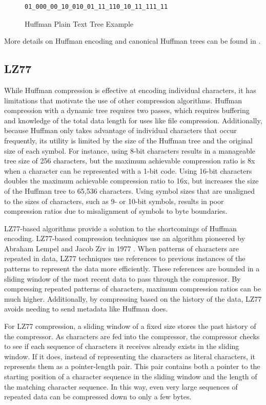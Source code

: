 \documentclass[doublespace,nopageskip]{VTthesis}
\begin{document}
\begin{figure}[htb]
	\centering
    \begin{lstlisting}
01_000_00_10_010_01_11_110_10_11_111_11
    \end{lstlisting}
	\caption{Huffman Plain Text Tree Example}
	\label{fig:huffman_plain_text}
\end{figure}

More details on Huffman encoding and canonical Huffman trees can be found in \cite{huffman, canonicalhuffman}.

\subsection{LZ77}\label{ss:lz77}
While Huffman compression is effective at encoding individual characters, it has limitations that motivate the use of other compression algorithms. Huffman compression with a dynamic tree requires two passes, which requires buffering and knowledge of the total data length for uses like file compression. Additionally, because Huffman only takes advantage of individual characters that occur frequently, its utility is limited by the size of the Huffman tree and the original size of each symbol. For instance, using 8-bit characters results in a manageable tree size of 256 characters, but the maximum achievable compression ratio is 8x when a character can be represented with a 1-bit code. Using 16-bit characters doubles the maximum achievable compression ratio to 16x, but increases the size of the Huffman tree to 65,536 characters. Using symbol sizes that are unaligned to the sizes of characters, such as 9- or 10-bit symbols, results in poor compression ratios due to misalignment of symbols to byte boundaries.

LZ77-based algorithms provide a solution to the shortcomings of Huffman encoding. LZ77-based compression techniques use an algorithm pioneered by Abraham Lempel and Jacob Ziv in 1977 \cite{lz77}. When patterns of characters are repeated in data, LZ77 techniques use references to previous instances of the patterns to represent the data more efficiently. These references are bounded in a sliding window of the most recent data to pass through the compressor. By compressing repeated patterns of characters, maximum compression ratios can be much higher. Additionally, by compressing based on the history of the data, LZ77 avoids needing to send metadata like Huffman does.

For LZ77 compression, a sliding window of a fixed size stores the past history of the compressor. As characters are fed into the compressor, the compressor checks to see if each sequence of characters it receives already exists in the sliding window. If it does, instead of representing the characters as literal characters, it represents them as a pointer-length pair. This pair contains both a pointer to the starting position of a character sequence in the sliding window and the length of the matching character sequence. In this way, even very large sequences of repeated data can be compressed down to only a few bytes.
\end{document}

